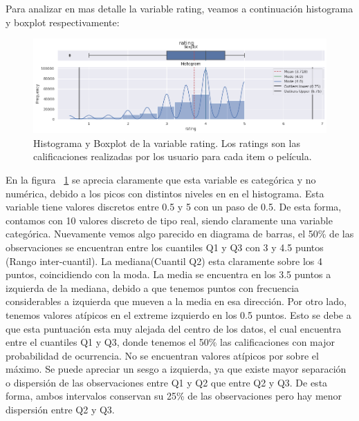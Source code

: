 \documentclass[11pt,a4paper,twoside]{thesis}
\begin{document}
\clearpage

Para analizar en mas detalle la variable rating, veamos a continuación histograma y boxplot respectivamente:

\begin{center}
\end{center}

\begin{figure}[h!]
	\centering
	\includegraphics[width=15cm]{./images/rating-boxplot-histplot.png}
	\caption{Histograma y Boxplot de la variable rating. Los ratings son las calificaciones realizadas por los usuario para cada item o película.}
	\label{fig:ratingsHistPlot}
\end{figure}

En la figura ~\ref{fig:ratingsHistPlot} se aprecia claramente que esta variable es categórica y no numérica, debido a los picos con distintos niveles en en el histograma. Esta variable tiene valores discretos entre 0.5 y 5 con un paso de 0.5. De esta forma, contamos con 10 valores discreto de tipo real, siendo claramente una variable categórica. Nuevamente vemos algo parecido en diagrama de barras, el 50\% de las observaciones se encuentran entre los cuantiles Q1 y Q3 con 3 y 4.5 puntos (Rango inter-cuantil). La mediana(Cuantil Q2) esta claramente sobre los 4 puntos, coincidiendo con la moda. La media se encuentra en los 3.5 puntos a izquierda de la mediana, debido a que tenemos puntos con frecuencia considerables a izquierda que mueven a la media en esa dirección.
Por otro lado, tenemos valores atípicos en el extreme izquierdo en los 0.5 puntos. Esto se debe a que esta puntuación esta muy alejada del centro de los datos, el cual encuentra entre el cuantiles Q1 y Q3, donde tenemos el 50\% las calificaciones con major probabilidad de ocurrencia. No se encuentran valores atípicos por sobre el máximo.
Se puede apreciar un sesgo a izquierda, ya que existe mayor separación o dispersión de las observaciones entre Q1 y Q2 que entre Q2 y Q3. De esta forma, ambos intervalos conservan su 25\% de las observaciones pero hay menor dispersión entre Q2 y Q3.
\end{document}
